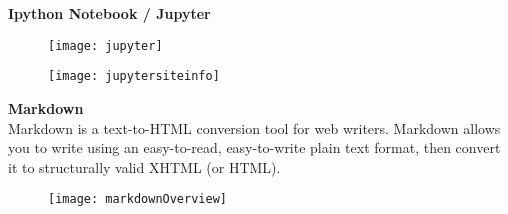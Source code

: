 \begin{frame}
	\textbf{Ipython Notebook / Jupyter}
	\vspace{-0.4cm}
	\begin{figure}
\centering
\texttt{[image: jupyter]}

\end{figure}

\end{frame}
	
\begin{frame}
	\begin{figure}
\centering
\texttt{[image: jupytersiteinfo]}

\end{figure}

\end{frame}
\begin{frame}
	\textbf{Markdown}
	\\
	Markdown is a text-to-HTML conversion tool for web writers. Markdown allows you to write using an easy-to-read, easy-to-write plain text format, then convert it to structurally valid XHTML (or HTML).
	\begin{figure}
\centering
\texttt{[image: markdownOverview]}

\end{figure}

\end{frame}

